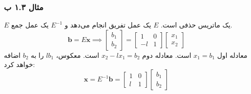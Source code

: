 \documentclass[12pt, a4paper]{book}
\begin{document}
	\subsubsection*{مثال ۱.۳ ب}
	$E$ یک ماتریس حذفی است. $E$ یک عمل تفریق انجام می‌دهد و $E^{-1}$ یک عمل جمع.
	\[ \mathbf{b} = E\mathbf{x} \implies \begin{bmatrix} b_1 \\ b_2 \end{bmatrix} = \begin{bmatrix} 1 & 0 \\ -l & 1 \end{bmatrix} \begin{bmatrix} x_1 \\ x_2 \end{bmatrix} \]
	معادله اول $x_1=b_1$ است. معادله دوم $x_2-lx_1=b_2$ است. معکوس، $lb_1$ را به $b_2$ اضافه خواهد کرد:
	\[ \mathbf{x} = E^{-1}\mathbf{b} = \begin{bmatrix} 1 & 0 \\ l & 1 \end{bmatrix} \begin{bmatrix} b_1 \\ b_2 \end{bmatrix} \]
	
\end{document}
